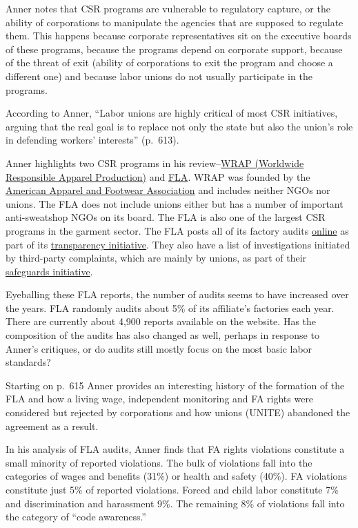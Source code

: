 \documentclass[
  12pt,
]{article}
\begin{document}
Anner notes that CSR programs are vulnerable to regulatory capture, or
the ability of corporations to manipulate the agencies that are supposed
to regulate them. This happens because corporate representatives sit on
the executive boards of these programs, because the programs depend on
corporate support, because of the threat of exit (ability of
corporations to exit the program and choose a different one) and because
labor unions do not usually participate in the programs.

According to Anner, ``Labor unions are highly critical of most CSR
initiatives, arguing that the real goal is to replace not only the state
but also the union's role in defending workers' interests'' (p.~613).

Anner highlights two CSR programs in his
review--\href{https://wrapcompliance.org/}{WRAP (Worldwide Responsible
Apparel Production)} and \href{https://www.fairlabor.org/}{FLA}. WRAP
was founded by the \href{https://www.aafaglobal.org/}{American Apparel
and Footwear Association} and includes neither NGOs nor unions. The FLA
does not include unions either but has a number of important
anti-sweatshop NGOs on its board. The FLA is also one of the largest CSR
programs in the garment sector. The FLA posts all of its factory audits
\href{https://fla.fairfactories.org/web/Information/CustomReports/FactoriesReport}{online}
as part of its
\href{https://www.fairlabor.org/transparency}{transparency initiative}.
They also have a list of investigations initiated by third-party
complaints, which are mainly by unions, as part of their
\href{https://www.fairlabor.org/transparency/safeguards}{safeguards
initiative}.

Eyeballing these FLA reports, the number of audits seems to have
increased over the years. FLA randomly audits about 5\% of its
affiliate's factories each year. There are currently about 4,900 reports
available on the website. Has the composition of the audits has also
changed as well, perhaps in response to Anner's critiques, or do audits
still mostly focus on the most basic labor standards?

Starting on p.~615 Anner provides an interesting history of the
formation of the FLA and how a living wage, independent monitoring and
FA rights were considered but rejected by corporations and how unions
(UNITE) abandoned the agreement as a result.

In his analysis of FLA audits, Anner finds that FA rights violations
constitute a small minority of reported violations. The bulk of
violations fall into the categories of wages and benefits (31\%) or
health and safety (40\%). FA violations constitute just 5\% of reported
violations. Forced and child labor constitute 7\% and discrimination and
harassment 9\%. The remaining 8\% of violations fall into the category
of ``code awareness.''
\end{document}
